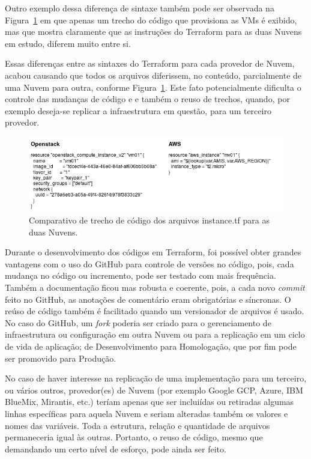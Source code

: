 \documentclass[12pt]{article}
\begin{document}
	Outro exemplo dessa diferença de sintaxe também pode ser observada na Figura~\ref{fig:figure3} em que apenas um trecho do código que provisiona as VMs é exibido, mas que mostra claramente que as instruções do Terraform para as duas Nuvens em estudo, diferem muito entre si.
	
	Essas diferenças entre as sintaxes do Terraform para cada provedor de Nuvem, acabou causando que todos os arquivos diferissem, no conteúdo, parcialmente de uma Nuvem para outra, conforme Figura~\ref{fig:figure3}. Este fato potencialmente dificulta o controle das mudanças de código e e também o reuso de trechos, quando, por exemplo deseja-se replicar a infraestrutura em questão, para um terceiro provedor.
		
	\begin{figure}[ht]
		\centering
		\includegraphics[width=0.97\linewidth]{figuras/Figure3.png}
		\caption{Comparativo de trecho de código dos arquivos instance.tf para as duas Nuvens.}
		\label{fig:figure3}
	\end{figure}

	Durante o desenvolvimento dos códigos em Terraform, foi possível obter grandes vantagens com o uso do GitHub para controle de versões no código, pois, cada mudança no código ou incremento, pode ser testado com mais frequência. Também a documentação ficou mas robusta e coerente, pois, a cada novo \textit{commit} feito no GitHub, as anotações de comentário eram obrigatórias e síncronas. O reúso de código também é facilitado quando um versionador de arquivos é usado. No caso do GitHub, um \textit{fork} poderia ser criado para o gerenciamento de infraestrutura ou configuração em outra Nuvem ou para a replicação em um ciclo de vida de aplicação; de Desenvolvimento para Homologação, que por fim pode ser promovido para Produção.
	
	No caso de haver interesse na replicação de uma implementação para um terceiro, ou vários outros, provedor(es) de Nuvem (por exemplo Google GCP, Azure, IBM BlueMix, Mirantis, etc.) teríam apenas que ser incluiídas ou retiradas algumas linhas específicas para aquela Nuvem e seriam alteradas também os valores e nomes das variáveis. Toda a estrutura, relação e quantidade de arquivos permaneceria igual às outras. Portanto, o reuso de código, mesmo que demandando um certo nível de esforço, pode ainda ser feito. 
	
\end{document}
